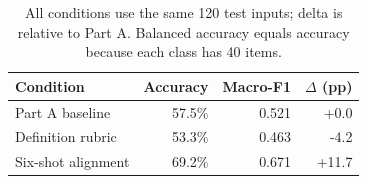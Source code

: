 \begin{table}[H]\centering\small
\begin{tabular}{lrrr}
\toprule
Condition & Accuracy & Macro-F1 & $\Delta$ (pp)\\
\midrule
Part A baseline & 57.5\% & 0.521 & +0.0\\
Definition rubric & 53.3\% & 0.463 & -4.2\\
Six-shot alignment & 69.2\% & 0.671 & +11.7\\
\bottomrule\end{tabular}
\caption{All conditions use the same 120 test inputs; delta is relative to Part A. Balanced accuracy equals accuracy because each class has 40 items.}
\end{table}
